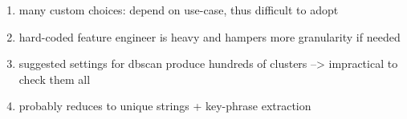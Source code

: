\begin{enumerate}
    \item many custom choices: depend on use-case, thus difficult to adopt
    \item hard-coded feature engineer is heavy and hampers more granularity if needed
    \item suggested settings for dbscan produce hundreds of clusters --> impractical to check them all
    \item probably reduces to unique strings + key-phrase extraction
\end{enumerate}


